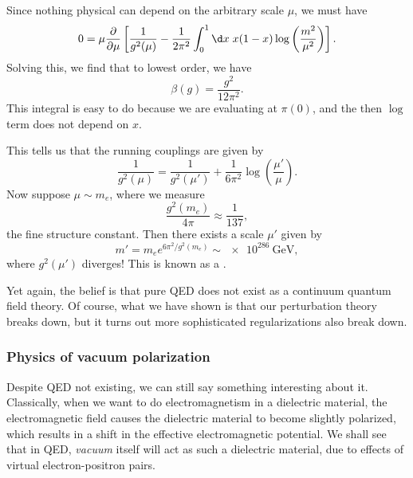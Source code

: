 \documentclass[a4paper]{article}
\begin{document}
Since nothing physical can depend on the arbitrary scale $\mu$, we must have
\[
  0 = \mu \frac{\partial}{\partial \mu} \left[\frac{1}{g^2(\mu)} - \frac{1}{2\pi^2} \int_0^1 \d x\; x(1 - x) \log\left(\frac{m^2}{\mu^2}\right)\right].
\]
Solving this, we find that to lowest order, we have
\[
  \beta(g) = \frac{g^2}{12 \pi^2}.
\]
This integral is easy to do because we are evaluating at $\pi(0)$, and the then $\log$ term does not depend on $x$.

This tells us that the running couplings are given by
\[
  \frac{1}{g^2(\mu)} = \frac{1}{g^2(\mu')} + \frac{1}{6\pi^2} \log\left(\frac{\mu'}{\mu}\right).
\]
Now suppose $\mu \sim m_e$, where we measure
\[
  \frac{g^2(m_e)}{4\pi} \approx \frac{1}{137},
\]
the fine structure constant. Then there exists a scale $\mu'$ given by
\[
  m' = m_e e^{6\pi^2/g^2(m_e)} \sim \SI{e286}{\giga\electronvolt},
\]
where $g^2(\mu')$ diverges! This is known as a .

Yet again, the belief is that pure QED does not exist as a continuum quantum field theory. Of course, what we have shown is that our perturbation theory breaks down, but it turns out more sophisticated regularizations also break down.

\subsubsection*{Physics of vacuum polarization}
Despite QED not existing, we can still say something interesting about it. Classically, when we want to do electromagnetism in a dielectric material, the electromagnetic field causes the dielectric material to become slightly polarized, which results in a shift in the effective electromagnetic potential. We shall see that in QED, \emph{vacuum} itself will act as such a dielectric material, due to effects of virtual electron-positron pairs.
\end{document}
